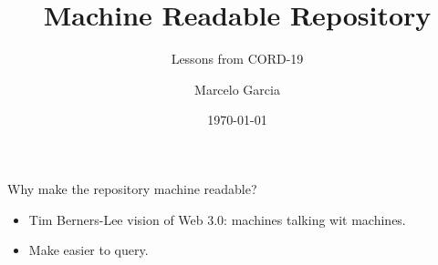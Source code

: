 \documentclass{beamer}
\title{Machine Readable Repository}
\subtitle{Lessons from CORD-19}
\author{Marcelo Garcia}
\institute{KAUST University Library}
\date{\today}
\begin{document}
\begin{frame}
\titlepage
\end{frame}

\begin{frame}
    Why make the repository machine readable?

    \begin{itemize}
        \item Tim Berners-Lee vision of Web 3.0: machines talking wit machines.
        \item Make easier to query.
    \end{itemize}
\end{frame}
\end{document}
